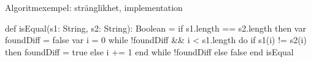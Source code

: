 \begin{Slide}{Algoritmexempel: stränglikhet, implementation}\SlideFontSmall
\begin{Code}
def isEqual(s1: String, s2: String): Boolean = 
  if s1.length == s2.length then
    var foundDiff = false
    var i = 0
    while !foundDiff && i < s1.length do
      if s1(i) != s2(i) then foundDiff = true
      else i += 1
    end while
    !foundDiff
  else false
end isEqual
\end{Code}



\end{Slide}
 







